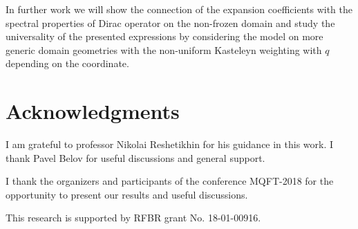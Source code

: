 \documentclass{article}
\begin{document}
In further work we will show the connection of the expansion coefficients with the spectral
properties of Dirac operator on the non-frozen domain and study the universality of the presented
expressions by considering the model on more generic domain geometries with the non-uniform
Kasteleyn weighting with $q$ depending on the coordinate.

\section*{Acknowledgments}
\label{sec:acknowledgements}
I am grateful to professor Nikolai Reshetikhin for his guidance in this work. I thank Pavel Belov
for useful discussions and general support.

I thank the organizers and participants of the conference MQFT-2018 for the opportunity
to present our results and useful discussions.

This research is supported by RFBR grant No. 18-01-00916.


{} 
\end{document}
